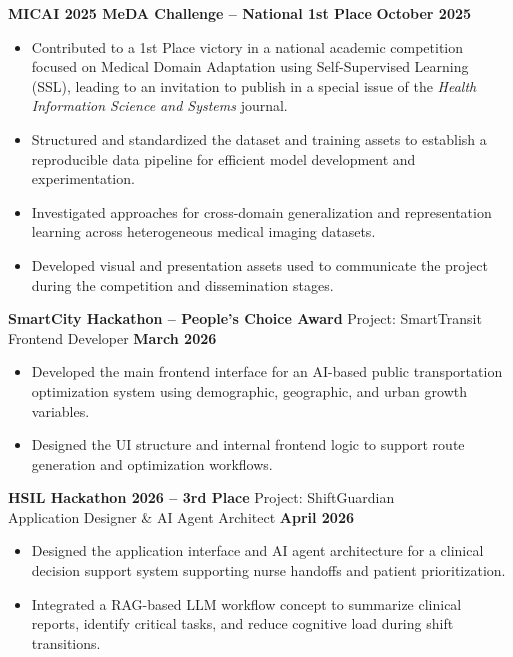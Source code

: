 \documentclass[11pt]{article}
\begin{document}
\textbf{MICAI 2025 MeDA Challenge -- National 1st Place} \hfill \textbf{October 2025}
\vspace{-0.3cm}
\begin{itemize}[leftmargin=*]
    \item Contributed to a 1st Place victory in a national academic competition focused on Medical Domain Adaptation using Self-Supervised Learning (SSL), leading to an invitation to publish in a special issue of the \textit{Health Information Science and Systems} journal.
    
    \vspace{-0.3cm}
    \item Structured and standardized the dataset and training assets to establish a reproducible data pipeline for efficient model development and experimentation.
    
    \vspace{-0.3cm}
    \item Investigated approaches for cross-domain generalization and representation learning across heterogeneous medical imaging datasets.

    \vspace{-0.3cm}
    \item Developed visual and presentation assets used to communicate the project during the competition and dissemination stages.
\end{itemize}



\textbf{SmartCity Hackathon -- People’s Choice Award} \hfill Project: SmartTransit\\
Frontend Developer \hfill \textbf{March 2026}
\vspace{-0.3cm}
\begin{itemize}[leftmargin=*]
    \item Developed the main frontend interface for an AI-based public transportation optimization system using demographic, geographic, and urban growth variables.
    
    \vspace{-0.3cm}
    \item Designed the UI structure and internal frontend logic to support route generation and optimization workflows.
\end{itemize}



\textbf{HSIL Hackathon 2026 -- 3rd Place} \hfill Project: ShiftGuardian\\
Application Designer \& AI Agent Architect \hfill \textbf{April 2026}
\vspace{-0.3cm}
\begin{itemize}[leftmargin=*]
    \item Designed the application interface and AI agent architecture for a clinical decision support system supporting nurse handoffs and patient prioritization.
    
    \vspace{-0.3cm}
    \item Integrated a RAG-based LLM workflow concept to summarize clinical reports, identify critical tasks, and reduce cognitive load during shift transitions.
\end{itemize}
\end{document}
